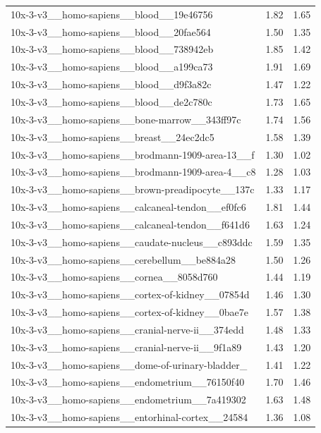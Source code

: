 \begin{table}[H]
{\begin{tabular}{lrr}
10x-3-v3\_\_homo-sapiens\_\_blood\_\_19e46756 & 1.82 & 1.65 \\
10x-3-v3\_\_homo-sapiens\_\_blood\_\_20fae564 & 1.50 & 1.35 \\
10x-3-v3\_\_homo-sapiens\_\_blood\_\_738942eb & 1.85 & 1.42 \\
10x-3-v3\_\_homo-sapiens\_\_blood\_\_a199ca73 & 1.91 & 1.69 \\
10x-3-v3\_\_homo-sapiens\_\_blood\_\_d9f3a82c & 1.47 & 1.22 \\
10x-3-v3\_\_homo-sapiens\_\_blood\_\_de2c780c & 1.73 & 1.65 \\
10x-3-v3\_\_homo-sapiens\_\_bone-marrow\_\_343ff97c & 1.74 & 1.56 \\
10x-3-v3\_\_homo-sapiens\_\_breast\_\_24ec2dc5 & 1.58 & 1.39 \\
10x-3-v3\_\_homo-sapiens\_\_brodmann-1909-area-13\_\_f & 1.30 & 1.02 \\
10x-3-v3\_\_homo-sapiens\_\_brodmann-1909-area-4\_\_c8 & 1.28 & 1.03 \\
10x-3-v3\_\_homo-sapiens\_\_brown-preadipocyte\_\_137c & 1.33 & 1.17 \\
10x-3-v3\_\_homo-sapiens\_\_calcaneal-tendon\_\_ef0fc6 & 1.81 & 1.44 \\
10x-3-v3\_\_homo-sapiens\_\_calcaneal-tendon\_\_f641d6 & 1.63 & 1.24 \\
10x-3-v3\_\_homo-sapiens\_\_caudate-nucleus\_\_c893ddc & 1.59 & 1.35 \\
10x-3-v3\_\_homo-sapiens\_\_cerebellum\_\_be884a28 & 1.50 & 1.26 \\
10x-3-v3\_\_homo-sapiens\_\_cornea\_\_8058d760 & 1.44 & 1.19 \\
10x-3-v3\_\_homo-sapiens\_\_cortex-of-kidney\_\_07854d & 1.46 & 1.30 \\
10x-3-v3\_\_homo-sapiens\_\_cortex-of-kidney\_\_0bae7e & 1.57 & 1.38 \\
10x-3-v3\_\_homo-sapiens\_\_cranial-nerve-ii\_\_374edd & 1.48 & 1.33 \\
10x-3-v3\_\_homo-sapiens\_\_cranial-nerve-ii\_\_9f1a89 & 1.43 & 1.20 \\
10x-3-v3\_\_homo-sapiens\_\_dome-of-urinary-bladder\_ & 1.41 & 1.22 \\
10x-3-v3\_\_homo-sapiens\_\_endometrium\_\_76150f40 & 1.70 & 1.46 \\
10x-3-v3\_\_homo-sapiens\_\_endometrium\_\_7a419302 & 1.63 & 1.48 \\
10x-3-v3\_\_homo-sapiens\_\_entorhinal-cortex\_\_24584 & 1.36 & 1.08 \\

\end{tabular}}
\end{table}
